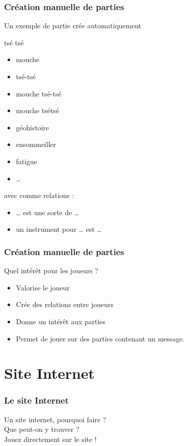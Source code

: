 \documentclass{beamer}
\begin{document}
\begin{frame}
  \frametitle{Création manuelle de parties}
  Un exemple de partie crée automatiquement
    \begin{center}
		tsé tsé
    \end{center}
	  \begin{multicols}{2}
		\begin{itemize}
		  \item mouche
		  \item tsé-tsé
		  \item mouche tsé-tsé
		  \item mouche tsétsé
		  \item géohistoire
		  \item ensommeiller
		  \item fatigue
		  \item \dots{}
	    \end{itemize}
	  \end{multicols}
	  avec comme relations :
	  \begin{itemize}
	  	\item \dots{} est une sorte de \dots{}
		\item un instrument pour \dots{} est \dots{}
	  \end{itemize}
\end{frame}

\begin{frame}
  \frametitle{Création manuelle de parties}
  \large Quel intérêt pour les joueurs ?

  \begin{itemize}
    \item Valorise le joueur
    \item Crée des relations entre joueurs
    \item Donne un intérêt aux parties
    \item Permet de jouer sur des parties contenant un message.
  \end{itemize}
\end{frame}

\section{Site Internet}
\begin{frame}
  \frametitle{Le site Internet}
  \large Un site internet, pourquoi faire ?
  \newline \\
  \large Que peut-on y trouver ?
  \newline \\
  \large Jouez directement sur le site !
\end{frame}
\end{document}
